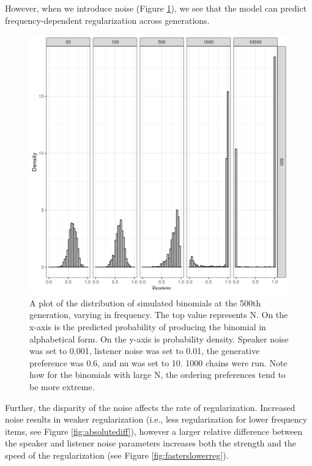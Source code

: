 \documentclass[
  jou,floatsintext]{apa6}
\begin{document}
However, when we introduce noise (Figure \ref{fig:regularizationplot1}), we see that the model can predict frequency-dependent regularization across generations.



\begin{figure}

{\centering \includegraphics[width=1\linewidth]{Figures/speaker_noise_001_listener_01} 

}

\caption{A plot of the distribution of simulated binomials at the 500th generation, varying in frequency. The top value represents N. On the x-axis is the predicted probability of producing the binomial in alphabetical form. On the y-axis is probability density. Speaker noise was set to 0.001, listener noise was set to 0.01, the generative preference was 0.6, and nu was set to 10. 1000 chains were run. Note how for the binomials with large N, the ordering preferences tend to be more extreme.}\label{fig:regularizationplot1}
\end{figure}

Further, the disparity of the noise affects the rate of regularization. Increased noise results in weaker regularization (i.e., less regularization for lower frequency items, see Figure \ref{fig:absolutediff}), however a larger relative difference between the speaker and listener noise parameters increases both the strength and the speed of the regularization (see Figure \ref{fig:fasterslowerreg}).
\end{document}
